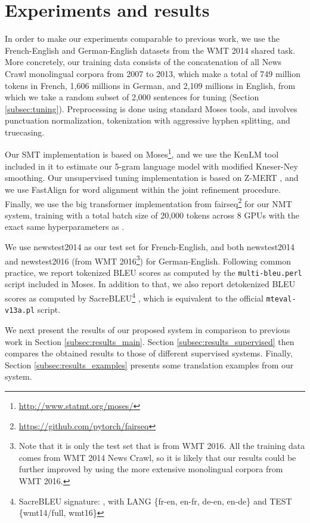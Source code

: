 \documentclass[11pt,a4paper]{article}
\begin{document}
\section{Experiments and results}
\label{sec:experiments}

In order to make our experiments comparable to previous work, we use the French-English and German-English datasets from the WMT 2014 shared task. More concretely, our training data consists of the concatenation of all News Crawl monolingual corpora from 2007 to 2013, which make a total of 749 million tokens in French, 1,606 millions in German, and 2,109 millions in English, from which we take a random subset of 2,000 sentences for tuning (Section \ref{subsec:tuning}). Preprocessing is done using standard Moses tools, and involves punctuation normalization, tokenization with aggressive hyphen splitting, and truecasing.

Our SMT implementation is based on Moses\footnote{\url{http://www.statmt.org/moses/}}, and we use the KenLM \citep{heafield2013scalable} tool included in it to estimate our 5-gram language model with modified Kneser-Ney smoothing. Our unsupervised tuning implementation is based on Z-MERT \citep{zaidan2009zmert}, and we use FastAlign \citep{dyer2013simple} for word alignment within the joint refinement procedure. Finally, we use the big transformer implementation from fairseq\footnote{\url{https://github.com/pytorch/fairseq}} for our NMT system, training with a total batch size of 20,000 tokens across 8 GPUs with the exact same hyperparameters as \citet{ott2018scaling}.

We use newstest2014 as our test set for French-English, and both newstest2014 and newstest2016 (from WMT 2016\footnote{Note that it is only the test set that is from WMT 2016. All the training data comes from WMT 2014 News Crawl, so it is likely that our results could be further improved by using the more extensive monolingual corpora from WMT 2016.}) for German-English. Following common practice, we report tokenized BLEU scores as computed by the \texttt{multi-bleu.perl} script included in Moses. In addition to that, we also report detokenized BLEU scores as computed by SacreBLEU\footnote{SacreBLEU signature: , with LANG  \{fr-en, en-fr, de-en, en-de\} and TEST  \{wmt14/full, wmt16\}} \citep{post2018call}, which is equivalent to the official \texttt{mteval-v13a.pl} script.

We next present the results of our proposed system in comparison to previous work in Section \ref{subsec:results_main}. Section \ref{subsec:results_supervised} then compares the obtained results to those of different supervised systems. Finally, Section \ref{subsec:results_examples} presents some translation examples from our system.
\end{document}
